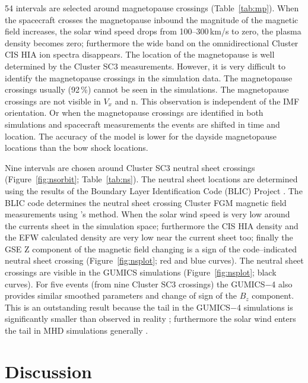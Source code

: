 \documentclass[linenumbers,draft]{agujournal}
\begin{document}
54 intervals are selected around magnetopause crossings (Table~\ref{tab:mp}). When the spacecraft crosses the magnetopause inbound the magnitude of the magnetic field increases, the solar wind speed drops from 100--300\,km/s to zero, the plasma density becomes zero; furthermore the wide band on the omnidirectional Cluster CIS HIA ion spectra disappears. The location of the magnetopause is well determined by the Cluster SC3 measurements. However, it is very difficult to identify the magnetopause crossings in the simulation data. The magnetopause crossings usually (92\,\%) cannot be seen in the simulations. The magnetopause crossings are not visible in $V_{x}$ and n. This observation is independent of the IMF orientation. Or when the magnetopause crossings are identified in both simulations and spacecraft measurements the events are shifted in time and location. The accuracy of the model is lower for the dayside magnetopause locations than the bow shock locations. 

Nine intervals are chosen around Cluster SC3 neutral sheet crossings (Figure~\ref{fig:nsorbit}; Table~\ref{tab:ns}). The neutral sheet locations are determined using the results of the Boundary Layer Identification Code (BLIC) Project \citep{facskoon:_bow_clust}. The BLIC code determines the neutral sheet crossing Cluster FGM magnetic field measurements using \citet{wang94:_signat}'s method. When the solar wind speed is very low around the currents sheet in the simulation space; furthermore the CIS HIA density and the EFW calculated density are very low near the current sheet too; finally the GSE Z component of the magnetic field changing is a sign of the code--indicated neutral sheet crossing (Figure~\ref{fig:nsplot}; red and blue curves). The neutral sheet crossings are visible in the GUMICS simulations (Figure~\ref{fig:nsplot}; black curves). For five events (from nine Cluster SC3 crossings) the GUMICS$-$4 also provides similar smoothed parameters and change of sign of the $B_{z}$ component. This is an outstanding result because the tail in the GUMICS$-$4 simulations is significantly smaller than observed in reality \citep{gordeev13:_verif_gumic_mhd,facsko16:_one_earth}; furthermore the solar wind enters the tail in MHD simulations generally \citep{kallio15:_proper}.

\section{Discussion}
\label{sec:discussion}
\end{document}
